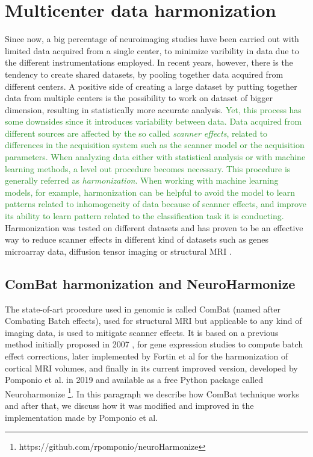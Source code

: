 \documentclass[11pt]{report}
\begin{document}
\newpage


\chapter{Multicenter data harmonization}\label{chap:harmonization_theory}
Since now, a big percentage of neuroimaging studies have been carried out with limited data acquired from a single center, to minimize varibility in data due to the different instrumentations employed.
In recent years, however, there is the tendency to create shared datasets, by pooling together data acquired from different centers.
A positive side of creating a large dataset by putting together data from multiple centers is the possibility to work on dataset of bigger dimension, resulting in statistically more accurate analysis.
\textcolor{ForestGreen}{
Yet, this process has some downsides since it introduces variability between data.
Data acquired from different sources are affected by the so called \emph{scanner effects}, related to differences in the acquisition system such as the scanner model or the acquisition parameters.
When analyzing data either with statistical analysis or with machine learning methods, a level out procedure becomes necessary.
This procedure is generally referred as \emph{harmonization}.
When working with machine learning models, for example, harmonization can be helpful to avoid the model to learn patterns related to inhomogeneity of data because of scanner effects, and improve its ability to learn pattern related to the classification task it is conducting.
}
Harmonization was tested on different datasets and has proven to be an effective way to reduce scanner effects in different kind of datasets such as genes microarray data, diffusion tensor imaging or structural MRI \cite{johnson-2006} \cite{fortin-2017} \cite{lombardi2020}.

\section{ComBat harmonization and NeuroHarmonize}\label{sec:harmonizationtheory}


The state-of-art procedure used in genomic is called ComBat (named after Combating Batch effects), used for structural MRI but applicable to any kind of imaging data, is used to mitigate scanner effects.
It is based on a previous method initially proposed in 2007 \cite{johnson-2006}, for gene expression studies to compute batch effect corrections, later implemented by Fortin et al \cite{fortin-2018} for the harmonization of cortical MRI volumes, and finally in its current improved version, developed by Pomponio et al. \cite{pomponio-2019} in 2019 and available as a free Python package called Neuroharmonize \footnote{https://github.com/rpomponio/neuroHarmonize}.
In this paragraph we describe how ComBat technique works and after that, we discuss how it was modified and improved in the implementation made by Pomponio et al.
\end{document}
